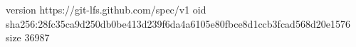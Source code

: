 version https://git-lfs.github.com/spec/v1
oid sha256:28fc35ca9d250db0be413d239f6da4a6105e80fbce8d1ccb3fcad568d20e1576
size 36987
